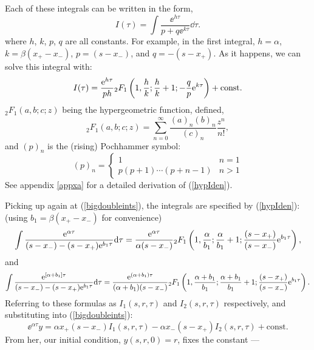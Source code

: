 \noindent
Each of these integrals can be written in the form,
\begin{equation*}
I(\tau) = \int\frac{\ee^{h\tau}}{p+q\ee^{k\tau}}\dd\tau.
\end{equation*}
where $h$, $k$, $p$, $q$ are all constants. For example, in the first integral, $h = \alpha$, $k = \beta(x_+ - x_-)$, $p = (s-x_-)$, and $q = -(s-x_+)$. As it happens, we can solve this integral with: 
\begin{equation}
\label{hypIden}
I(\tau) = \frac{{\rm e}^{h\tau}}{ph} {}_2F_1\left(1,\frac{h}{k};\frac{h}{k}+1; -\frac{q}{p}{\rm e}^{k\tau}\right) + \text{const}.
\end{equation}
${}_2F_1(a,b;c;z)$ being the hypergeometric function, defined,
\begin{equation*}
{}_2F_1(a,b;c;z) =\sum^\infty_{n=0}\frac{(a)_n(b)_n}{(c)_n}\frac{z^n}{n!},
\end{equation*}
and $(p)_n$ is the (rising) Pochhammer  symbol:
$$(p)_n = \begin{cases} 1 &n=1\\
p(p+1)\cdots(p+n-1) &n>1
\end{cases}
$$
See appendix \ref{appxa} for a detailed derivation of (\ref{hypIden}).\par
Picking up again at (\ref{bigdoubleints}), the integrals are specified by (\ref{hypIden}):\\
(using $b_1 = \beta(x_+ - x_-)$ for convenience)
\begin{equation*}
\int \frac{ {\rm e}^{\alpha \tau} } {(s-x_-) - (s-x_+){\rm e}^{b_1 \tau}}{\rm d}\tau =  \frac{{\rm e}^{\alpha\tau}}{\alpha(s-x_-)} {}_2F_1\left(1,\frac{\alpha}{b_1 };\frac{\alpha}{b_1 }+1; \frac{(s-x_+)}{(s-x_-)}{\rm e}^{b_1  \tau}\right),
\end{equation*}
and
\begin{equation*}
\int\frac{{\rm e}^{\left[ \alpha +b_1\right]\tau}}{(s-x_-) - (s-x_+){\rm e}^{b_1 \tau}}{\rm d}\tau =   \frac{{\rm e}^{(\alpha+b_1 )\tau}}{(\alpha+b_1 )(s-x_-)} {}_2F_1\left(1,\frac{\alpha + b_1 }{b_1 };\frac{\alpha + b_1 }{b_1 }+1; \frac{(s-x_+)}{(s-x_-)}{\rm e}^{b_1  \tau}\right).
\end{equation*}
Referring to these formulas as $I_1(s,r,\tau)$ and $I_2(s,r,\tau)$ respectively, and substituting into (\ref{bigdoubleints}): 
\begin{equation}
\label{eywithconst}
\ee^{\alpha\tau }y = \alpha x_+(s-x_-)I_1(s,r,\tau) - \alpha x_- (s-x_+) I_2(s,r,\tau) + \text{const}.
\end{equation}
From her, our initial condition, $y(s,r,0) = r$, fixes the constant ---
